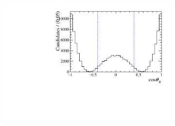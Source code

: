 \begin{figure}[!ht]
\begin{subfigure}[t]{0.32\textwidth}
        \includegraphics[width=1.0\textwidth]{figs/B2DsPhi/f2_Helicity.pdf}
    \end{subfigure}\\
   

\end{figure}

